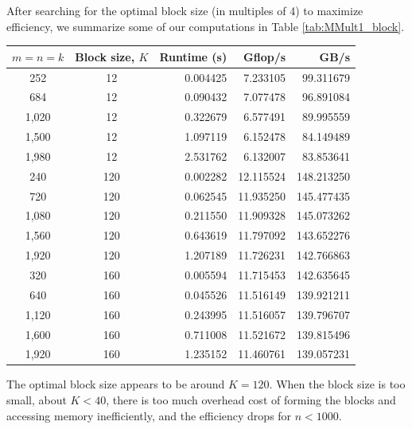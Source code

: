 \begin{questions}
\begin{solution}
    After searching for the optimal block size (in multiples of 4) to maximize efficiency,
    we summarize some of our computations in Table \ref{tab:MMult1_block}.
    
    \begin{center}
    \begin{tabular}{|c|c|r|r|r|}
    \hline
    $m=n=k$ & Block size, $K$ & Runtime (s) & Gflop/s & GB/s \\
    \hline\hline
    252 & 12 & 0.004425 &  7.233105 & 99.311679 \\
    \hline
    684 & 12 & 0.090432 &  7.077478 & 96.891084 \\
    \hline
    1,020 & 12 & 0.322679 &  6.577491 & 89.995559 \\
    \hline
    1,500 & 12 & 1.097119 &  6.152478 & 84.149489 \\
    \hline
    1,980 & 12 & 2.531762 &  6.132007 & 83.853641  \\
    \hline\hline
    240 & 120 & 0.002282 & 12.115524 & 148.213250 \\
    \hline
    720 & 120 & 0.062545 & 11.935250 & 145.477435 \\
    \hline
    1,080 & 120 & 0.211550 & 11.909328 & 145.073262 \\
    \hline
    1,560 & 120 & 0.643619 & 11.797092 & 143.652276  \\
    \hline
    1,920 & 120 & 1.207189 & 11.726231 & 142.766863 \\
    \hline\hline
    320 & 160 & 0.005594 & 11.715453 & 142.635645 \\
    \hline
    640 & 160 & 0.045526 & 11.516149 & 139.921211 \\
    \hline
    1,120 & 160 & 0.243995 & 11.516057 & 139.796707 \\
    \hline
    1,600 & 160 & 0.711008 & 11.521672 & 139.815496 \\
    \hline
    1,920 & 160 & 1.235152 & 11.460761 & 139.057231 \\
    \hline
    \end{tabular}
    \label{tab:MMult1_block}
    \end{center}
    
    The optimal block size appears to be around $K=120$. When the block size is too small,
    about $K < 40$, there is too much overhead cost of forming the blocks and accessing
    memory inefficiently, and the efficiency drops for $n < 1000$. 
    

\end{solution}
\end{questions}
